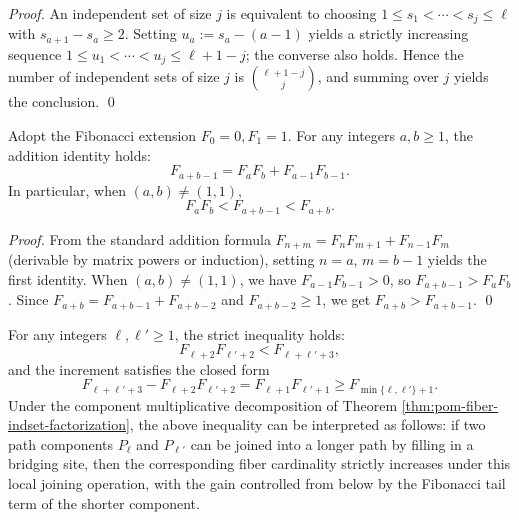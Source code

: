\begin{proof}
An independent set of size \(j\) is equivalent to choosing \(1\le s_1<\cdots<s_j\le \ell\) with \(s_{a+1}-s_a\ge 2\).
Setting \(u_a:=s_a-(a-1)\) yields a strictly increasing sequence \(1\le u_1<\cdots<u_j\le \ell+1-j\); the converse also holds.
Hence the number of independent sets of size \(j\) is \(\binom{\ell+1-j}{j}\), and summing over \(j\) yields the conclusion. \qed
\end{proof}

\begin{lemma}\label{lem:pom-fib-fusion-submultiplicativity}
Adopt the Fibonacci extension \(F_0=0,F_1=1\).
For any integers \(a,b\ge 1\), the addition identity holds:
\[
F_{a+b-1}=F_aF_b+F_{a-1}F_{b-1}.
\]
In particular, when \((a,b)\neq(1,1)\),
\[
F_aF_b< F_{a+b-1}<F_{a+b}.
\]
\end{lemma}
\begin{proof}
From the standard addition formula \(F_{n+m}=F_nF_{m+1}+F_{n-1}F_m\) (derivable by matrix powers or induction), setting \(n=a\), \(m=b-1\) yields the first identity.
When \((a,b)\neq(1,1)\), we have \(F_{a-1}F_{b-1}>0\), so \(F_{a+b-1}>F_aF_b\).
Since \(F_{a+b}=F_{a+b-1}+F_{a+b-2}\) and \(F_{a+b-2}\ge 1\), we get \(F_{a+b}>F_{a+b-1}\). \qed
\end{proof}

\begin{corollary}\label{cor:pom-fib-component-fusion-gain}
For any integers \(\ell,\ell'\ge 1\), the strict inequality holds:
\[
F_{\ell+2}F_{\ell'+2}<F_{\ell+\ell'+3},
\]
and the increment satisfies the closed form
\[
F_{\ell+\ell'+3}-F_{\ell+2}F_{\ell'+2}=F_{\ell+1}F_{\ell'+1}\ge F_{\min\{\ell,\ell'\}+1}.
\]
Under the component multiplicative decomposition of Theorem \ref{thm:pom-fiber-indset-factorization}, the above inequality can be interpreted as follows: if two path components \(P_{\ell}\) and \(P_{\ell'}\) can be joined into a longer path by filling in a bridging site, then the corresponding fiber cardinality strictly increases under this local joining operation, with the gain controlled from below by the Fibonacci tail term of the shorter component.
\end{corollary}





